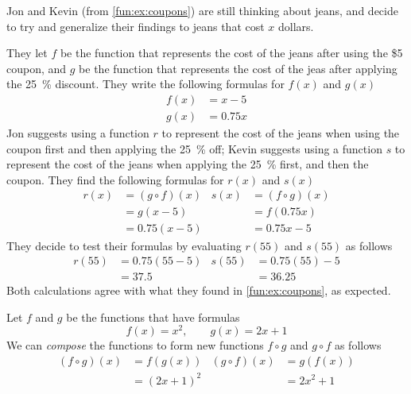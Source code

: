 \begin{pccexample}
  Jon and Kevin (from \cref{fun:ex:coupons}) are still thinking about jeans, 
  and decide to try and generalize their findings to jeans that cost $x$ dollars. 

  They let $f$ be the function that represents the cost of the jeans after
  using the \$5 coupon, and $g$ be the function that represents the cost of 
  the jeas after applying the \SI{25}{\percent} discount. They write 
  the following formulas for $f(x)$ and $g(x)$
  \begin{align*}
    f(x)&= x-5\\
    g(x)&=0.75x
  \end{align*}
  Jon suggests using a function $r$ to represent the cost of the jeans 
  when using the coupon first and then applying the \SI{25}{\percent} off;  
  Kevin suggests using a function $s$ to represent the cost of the jeans
  when applying the \SI{25}{\percent} first, and then the coupon.
  They find the following formulas for $r(x)$ and $s(x)$
  \begin{align*}
    r(x)&= (g\circ f)(x)    & s(x)&=(f\circ g)(x)\\
        &= g(x-5)           &      & = f(0.75x)\\
        & = 0.75(x-5)       &      & = 0.75x-5 
  \end{align*}
  They decide to test their formulas by evaluating $r(55)$ and $s(55)$ 
  as follows
  \begin{align*}
    r(55)& = 0.75(55-5) &   s(55)&=0.75(55)-5\\
        &=37.5          &        &=36.25
  \end{align*}
  Both calculations agree with what they found in \cref{fun:ex:coupons}, 
  as expected.
\end{pccexample}


\begin{pccexample}[Composition]
  Let $f$ and $g$ be the functions that have formulas
  \[
        f(x)=x^2, \qquad g(x)=2x+1
  \]
  We can \emph{compose} the functions to form new functions $f\circ g$
  and $g\circ f$ as follows
  \begin{align*}
    (f\circ g)(x)& = f(g(x))    &  (g\circ f)(x)&=g(f(x))\\
    &=(2x+1)^2   &  &=2x^2+1
  \end{align*}
\end{pccexample}

